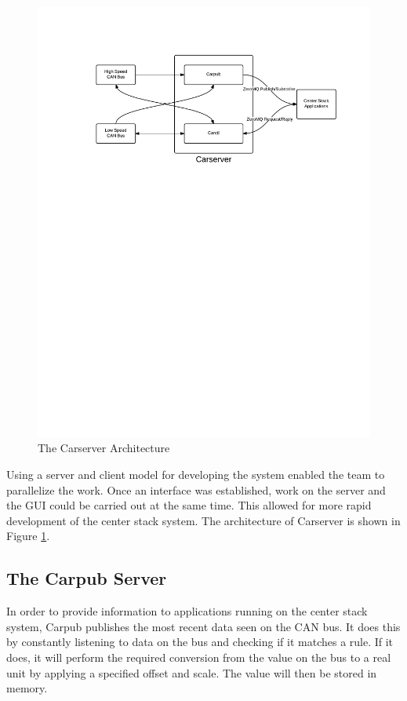 \documentclass[ece]{uw-wkrpt}
\begin{document}
\begin{figure}
    \centering
    \includegraphics[width=6.0in]{carserver}
    \caption[The Carserver Architecture]
            {The Carserver Architecture}
    \label{fig:carserver}
\end{figure}

Using a server and client model for developing the system enabled the team to
parallelize the work. Once an interface was established, work on the server and
the GUI could be carried out at the same time. This allowed for more rapid
development of the center stack system. The architecture of Carserver is shown
in Figure \ref{fig:carserver}.


\subsection{The Carpub Server}

In order to provide information to applications running on the center stack
system, Carpub publishes the most recent data seen on the CAN bus. It does this
by constantly listening to data on the bus and checking if it matches a rule. If
it does, it will perform the required conversion from the value on the bus to a
real unit by applying a specified offset and scale. The value will then be
stored in memory.
\end{document}
